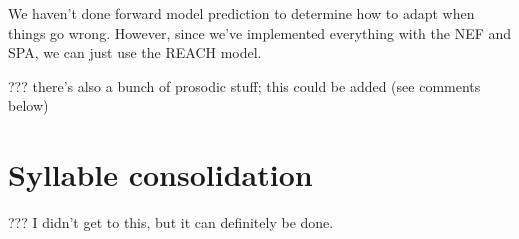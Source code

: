 We haven't done forward model prediction
to determine how to adapt
when things go wrong.
However, since we've implemented everything
with the NEF and SPA,
we can just use the REACH model.

??? there's also a bunch of prosodic stuff;
this could be added (see comments below)





\section{Syllable consolidation}

??? I didn't get to this,
but it can definitely be done.

